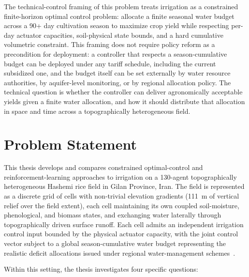 The technical-control framing of this problem treats irrigation as a
constrained finite-horizon optimal control problem: allocate a finite
seasonal water budget across a 90+ day cultivation season to maximize
crop yield while respecting per-day actuator capacities, soil-physical
state bounds, and a hard cumulative volumetric constraint. This
framing does not require policy reform as a precondition for
deployment: a controller that respects a season-cumulative budget can
be deployed under any tariff schedule, including the current
subsidized one, and the budget itself can be set externally by water
resource authorities, by aquifer-level monitoring, or by regional
allocation policy. The technical question is whether the controller
can deliver agronomically acceptable yields given a finite water
allocation, and how it should distribute that allocation in space
and time across a topographically heterogeneous field.

\section{Problem Statement}
\label{sec:intro-problem}

This thesis develops and compares constrained optimal-control and
reinforcement-learning approaches to irrigation on a 130-agent
topographically heterogeneous Hashemi rice field in Gilan Province,
Iran. The field is represented as a discrete grid of cells with
non-trivial elevation gradients (111~m of vertical relief over the
field extent), each cell maintaining its own coupled soil-moisture,
phenological, and biomass states, and exchanging water laterally
through topographically driven surface runoff. Each cell admits an
independent irrigation control input bounded by the physical actuator
capacity, with the joint control vector subject to a global
season-cumulative water budget representing the realistic deficit
allocations issued under regional water-management
schemes~\cite{Mesgaran2018,Nouri2023}.

Within this setting, the thesis investigates four specific questions:

